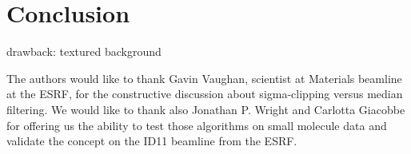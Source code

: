 \documentclass[preprint]{iucr}              %
\begin{document}
\section{Conclusion}
drawback: textured background



The authors would like to thank Gavin Vaughan, scientist at Materials beamline at the ESRF,  for the constructive discussion about sigma-clipping versus median filtering. 
We would like to thank also Jonathan P. Wright and Carlotta Giacobbe for offering us the ability to test those algorithms on small molecule data and validate the concept on the ID11 beamline from the ESRF.




\end{document}
